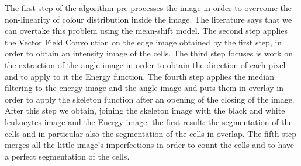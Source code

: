 \bigskip


The first step of the algorithm pre-processes the image in order to overcome the non-linearity  of colour distribution inside the image. The literature says that we can overtake this problem using the mean-shift model. The second step applies the Vector Field Convolution on the edge image obtained by the first step, in order to obtain an intensity image of the cells. The third step focuses is work on the extraction of the angle image in order to obtain the direction of each pixel and to apply to it the Energy function. The fourth step applies the median filtering to the energy image and the angle image and puts them in overlay in order to apply the skeleton function after an opening of the closing of the image. After this step we obtain, joining the skeleton image with the black and white leukocytes image and the Energy image, the first result: the segmentation of the cells and in particular also the segmentation of the cells in overlap.
The fifth step merges all the little image's imperfections in order to count the cells and to have a perfect segmentation of the cells.